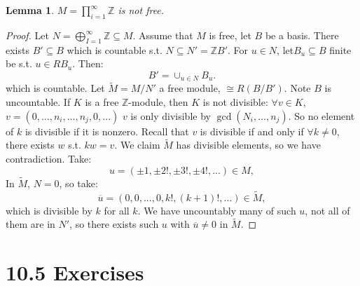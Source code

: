 \documentclass[12pt]{amsbook}
\theoremstyle{plain}
\numberwithin{section}{chapter}
\numberwithin{equation}{chapter}
\newtheorem{lem}[theorem]{Lemma}
\theoremstyle{definition}
\theoremstyle{remark}
\newcommand{\sub}{\subseteq}
\newcommand{\z}{\mathbb{Z}}
\renewcommand{\bar}{\overline}%
\begin{document}
\begin{lem}
$M = \prod_{i = 1}^\infty \z$ is not free. 
\end{lem}

\begin{proof}
Let $N = \bigoplus_{I = 1}^\infty \z \sub M$. Assume that $M$ is free, let $B$ be a basis. There exists $B' \sub B$ which is countable s.t. $N \sub N' = \z B'$. For $u \in N$, let$B_u \sub B$ finite be s.t. $u \in RB_u$. Then:
$$
B' = \cup_{u \in N}B_u.
$$
which is countable. Let $\tilde{M} = M/N'$ a free module, $\cong R(B/B')$. Note $B$ is uncountable. If $K$ is a free $\z$-module, then $K$ is not divisible: 
$\forall v \in K$, $v = (0,...,n_i,...,n_j,0,...)$ $v$ is only divisible by $\gcd(N_i,...,n_j)$. So no element of $k$ is divisible if it is nonzero. Recall that $v$ is divisible if and only if $\forall k \neq 0$, there exists $w$ s.t. $kw = v$. We claim $\tilde{M}$ has divisible elements, so we have contradiction. Take:
$$
u = (\pm 1,\pm 2!,\pm 3!,\pm 4!,...) \in M,
$$
In $\tilde{M}$, $N = 0$, so take:
$$
\bar{u} = (0,0,...,0,k!,(k + 1)!,...) \in \tilde{M},
$$
 which is divisible by $k$ for all $k$. We have uncountably many of such $u$, not all of them are in $N'$, so there exists such $u$ with $\bar{u} \neq 0$ in $\tilde{M}$. 
\end{proof}


















\section*{10.5 Exercises}
\end{document}
